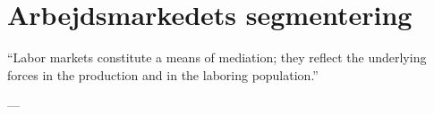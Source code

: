 




\chapter{Arbejdsmarkedets segmentering\label{kapitel_teori_AST}}








\vspace{20pt} \epigraphfontsize{\small\itshape}
\epigraphfontsize{\small\itshape}
\epigraph{“Labor markets constitute a means of mediation; they reflect the underlying forces in the production and in the laboring population.”}{--- \textup{\parencite[177]{Edwards1979}}}



